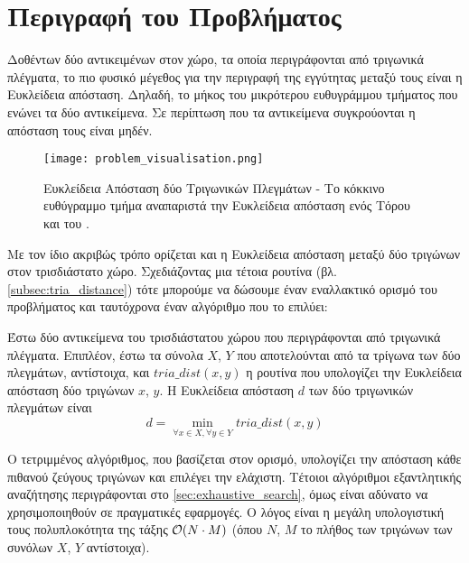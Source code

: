 \section{Περιγραφή του Προβλήματος}
\label{sec:problem_description}
Δοθέντων δύο αντικειμένων στον χώρο, τα οποία περιγράφονται από 
τριγωνικά πλέγματα, το πιο φυσικό μέγεθος για την περιγραφή της 
εγγύτητας μεταξύ τους είναι η Ευκλείδεια απόσταση. 
Δηλαδή, το μήκος του μικρότερου ευθυγράμμου τμήματος που ενώνει 
τα δύο αντικείμενα. Σε περίπτωση που τα αντικείμενα συγκρούονται 
η απόσταση τους είναι μηδέν.

\begin{figure}[h]
    \centering
    \texttt{[image: problem\_visualisation.png]}
    \caption[Οπτική Αναπαράσταση του Προβλήματος]{
        Ευκλείδεια Απόσταση δύο Τριγωνικών Πλεγμάτων - 
        Το κόκκινο ευθύγραμμο τμήμα αναπαριστά την Ευκλείδεια
        απόσταση ενός Τόρου και του .  
    }
\end{figure}

Με τον ίδιο ακριβώς τρόπο ορίζεται και η Ευκλείδεια απόσταση 
μεταξύ δύο τριγώνων στον τρισδιάστατο χώρο. 
Σχεδιάζοντας μια τέτοια ρουτίνα (βλ. \ref{subsec:tria_distance}) 
τότε μπορούμε να δώσουμε έναν εναλλακτικό ορισμό του προβλήματος
και ταυτόχρονα έναν αλγόριθμο που το επιλύει: 

\begin{definition}
    Έστω δύο αντικείμενα του τρισδιάστατου χώρου που περιγράφονται 
    από τριγωνικά πλέγματα. Επιπλέον, έστω τα σύνολα $X$, $Y$ που 
    αποτελούνται από τα τρίγωνα των δύο πλεγμάτων, αντίστοιχα, και 
    $tria\_dist(x,y)$ η ρουτίνα που υπολογίζει την Ευκλείδεια απόσταση
    δύο τριγώνων $x$, $y$.
    Η Ευκλείδεια απόσταση $d$ των δύο τριγωνικών πλεγμάτων είναι
    \[ d = \min_{\forall x \in X, \forall y \in Y} tria\_dist(x,y) \]    
\end{definition}

Ο τετριμμένος αλγόριθμος, που βασίζεται στον ορισμό, υπολογίζει την απόσταση 
κάθε πιθανού ζεύγους τριγώνων και επιλέγει την ελάχιστη. Τέτοιοι αλγόριθμοι 
εξαντλητικής αναζήτησης περιγράφονται στο \ref{sec:exhaustive_search}, όμως
είναι αδύνατο να χρησιμοποιηθούν σε πραγματικές εφαρμογές. O λόγος είναι η μεγάλη
υπολογιστική τους πολυπλοκότητα της τάξης $\mathcal{O}(N \cdot M)$ (όπου $N$, $M$ το 
πλήθος των τριγώνων των συνόλων $X$, $Y$ αντίστοιχα).

